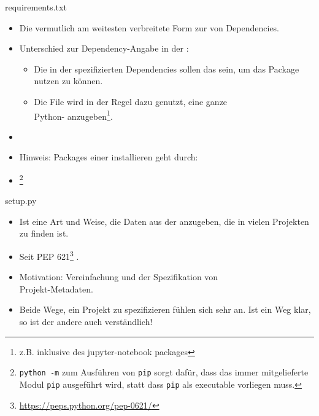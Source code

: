\documentclass[12pt, aspectratio=169, usepdftitle=false]{beamer}
\newcommand{\furl}[1]{\footnote{\url{#1}}}
\begin{document}
\begin{frame}{requirements.txt}
	\begin{itemize}
		\item Die vermutlich am weitesten verbreitete Form zur  von Dependencies.
		\item Unterschied zur Dependency-Angabe in der :
		\begin{itemize}
			\item Die in der  spezifizierten Dependencies sollen das  sein, um das Package nutzen zu können.
			\item Die  File wird in der Regel dazu genutzt, eine ganze\\ Python- anzugeben\footnote{z.B. inklusive des jupyter-notebook packages}.
		\end{itemize}
		
		\item[]
		\item Hinweis:  Packages einer  installieren geht durch:
		\item[] \footnote{\texttt{python -m} zum Ausführen von \texttt{pip} sorgt dafür, dass das immer mitgelieferte Modul \texttt{pip} ausgeführt wird, statt dass \texttt{pip} als executable vorliegen muss.}

	\end{itemize}
	
\end{frame}


\begin{frame}{setup.py}
	\begin{itemize}
		\item Ist eine  Art und Weise, die Daten aus der  anzugeben, die in vielen Projekten zu finden ist.
		\item Seit PEP 621\furl{https://peps.python.org/pep-0621/} .
		\item[] Motivation: Vereinfachung und  der Spezifikation von\\ Projekt-Metadaten.
		\item Beide Wege, ein Projekt zu spezifizieren fühlen sich sehr  an. Ist ein Weg klar, so ist der andere auch verständlich!
	\end{itemize}	
\end{frame}


\framecardfragen
\end{document}
